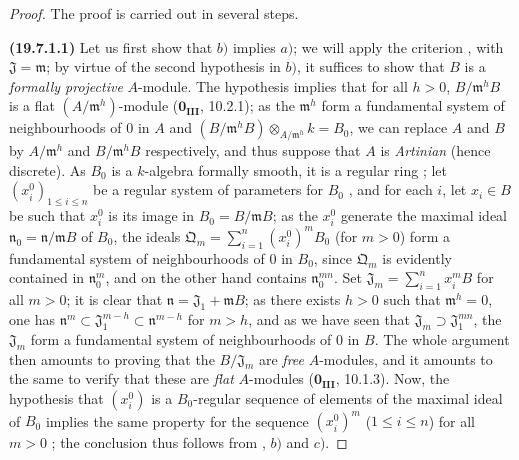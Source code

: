\begin{proof}
The proof is carried out in several steps.

\medskip
\noindent{}\label{0.19.7.1.1}\textbf{(19.7.1.1)}\enspace
Let us first show that $b)$ implies $a)$; we will apply the criterion , with $\mathfrak{J}=\mathfrak{m}$; by virtue of the second hypothesis in $b)$, it suffices to show that $B$ is a \emph{formally projective} $A$-module.
The hypothesis implies that for all $h>0$, $B/\mathfrak{m}^h B$ is a flat $(A/\mathfrak{m}^h)$-module ($\mathbf{0_{III}}$, 10.2.1); as the $\mathfrak{m}^h$ form a fundamental system of neighbourhoods of $0$ in $A$ and $(B/\mathfrak{m}^h B)\otimes_{A/\mathfrak{m}^h} k = B_0$, we can replace $A$ and $B$ by $A/\mathfrak{m}^h$ and $B/\mathfrak{m}^h B$ respectively, and thus suppose that $A$ is \emph{Artinian} (hence discrete).
As $B_0$ is a $k$-algebra formally smooth, it is a regular ring ; let $(x_i^0)_{1\leq i\leq n}$ be a regular system of parameters for $B_0$ ,
and for each $i$, let $x_i\in B$ be such that $x_i^0$ is its image in $B_0=B/\mathfrak{m}B$; as the $x_i^0$ generate the maximal ideal $\mathfrak{n}_0=\mathfrak{n}/\mathfrak{m}B$ of $B_0$, the ideals $\mathfrak{Q}_m=\sum_{i=1}^n (x_i^0)^m B_0$ (for $m>0$) form a fundamental system of neighbourhoods of $0$ in $B_0$, since $\mathfrak{Q}_m$ is evidently contained in $\mathfrak{n}_0^m$, and on the other hand contains $\mathfrak{n}_0^{mn}$.
Set $\mathfrak{J}_m=\sum_{i=1}^n x_i^m B$ for all $m>0$;
it is clear that $\mathfrak{n}=\mathfrak{J}_1+\mathfrak{m}B$; as there exists $h>0$ such that $\mathfrak{m}^h=0$, one has $\mathfrak{n}^m\subset\mathfrak{J}_1^{m-h}\subset\mathfrak{n}^{m-h}$ for $m>h$, and as we have seen that $\mathfrak{J}_m\supset\mathfrak{J}_1^{mn}$, the $\mathfrak{J}_m$ form a fundamental system of neighbourhoods of $0$ in $B$.
The whole argument then amounts to proving that the $B/\mathfrak{J}_m$ are \emph{free} $A$-modules, and it amounts to the same to verify that these are \emph{flat} $A$-modules ($\mathbf{0_{III}}$, 10.1.3).
Now, the hypothesis that $(x_i^0)$ is a $B_0$-regular sequence of elements of the maximal ideal of $B_0$ implies the same property for the sequence $(x_i^0)^m$ ($1\leq i\leq n$) for all $m>0$ ; the conclusion thus follows from , $b)$ and $c)$.
\end{proof}

